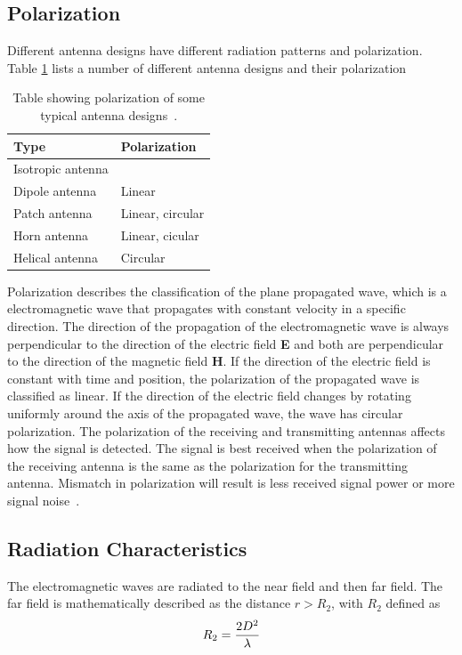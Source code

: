 \subsection{Polarization}
Different antenna designs have different radiation patterns and polarization. Table \ref{tab:antenna_types} lists a number of different antenna designs and their polarization
\begin{table}[H]
    \centering
    \begin{tabular}{l|l} 
        \textbf{Type} & \textbf{Polarization} \\
        \hline
        \hline
        Isotropic antenna & \\
        Dipole antenna & Linear \\
        Patch antenna & Linear, circular \\
        Horn antenna & Linear, cicular \\
        Helical antenna & Circular \\
    \end{tabular}
    \caption{Table showing polarization of some typical antenna designs~\cite[p. 11]{ant_beam_form}.}
    \label{tab:antenna_types}
\end{table}

Polarization describes the classification of the plane propagated wave, which is a electromagnetic wave that propagates with constant velocity in a specific direction. The direction of the propagation of the electromagnetic wave is always perpendicular to the direction of the electric field \textbf{E} and both are perpendicular to the direction of the magnetic field \textbf{H}. If the direction of the electric field is constant with time and position, the polarization of the propagated wave is classified as linear. If the direction of the electric field changes by rotating uniformly around the axis of the propagated wave, the wave has circular polarization. The polarization of the receiving and transmitting antennas affects how the signal is detected. The signal is best received when the polarization of the receiving antenna is the same as the polarization for the transmitting antenna. Mismatch in polarization will result is less received signal power or more signal noise~\cite[p. 82-84]{direct_energy}. 

\subsection{Radiation Characteristics}
The electromagnetic waves are radiated to the near field and then far field. The far field is mathematically described as the distance $r>R_2$, with $R_2$ defined as
\begin{equation} \label{eq:far_field}
    R_2 = \frac{2 D^2}{\lambda}
    \tagaddtext{[\si{\meter}]}
\end{equation}

